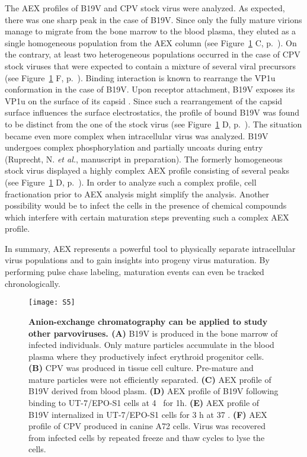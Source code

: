 The AEX profiles of B19V and CPV stock virus were analyzed. As expected, there was one sharp peak in the case of B19V. Since only the fully mature virions manage to migrate from the bone marrow to the blood plasma, they eluted as a single homogeneous population from the AEX column (see Figure~\ref{S5} C, p.~\pageref{S5}). On the contrary, at least two heterogeneous populations occurred in the case of CPV stock viruses that were expected to contain a mixture of several viral precursors (see Figure~\ref{S5} F, p.~\pageref{S5}). Binding interaction is known to rearrange the VP1u conformation in the case of B19V. Upon receptor attachment, B19V exposes its VP1u on the surface of its capsid \cite{pmid20826697}. Since such a rearrangement of the capsid surface influences the surface electrostatics, the profile of bound B19V was found to be distinct from the one of the stock virus (see Figure~\ref{S5} D, p.~\pageref{S5}). The situation became even more complex when intracellular virus was analyzed. B19V undergoes complex phosphorylation and partially uncoats during entry (Ruprecht, N. \textit{et al.}, manuscript in preparation). The formerly homogeneous stock virus displayed a highly complex AEX profile consisting of several peaks (see Figure~\ref{S5} D, p.~\pageref{S5}). In order to analyze such a complex profile, cell fractionation prior to AEX analysis might simplify the analysis. Another possibility would be to infect the cells in the presence of chemical compounds which interfere with certain maturation steps preventing such a complex AEX profile. 

In summary, AEX represents a powerful tool to physically separate intracellular virus populations and to gain insights into progeny virus maturation. By performing pulse chase labeling, maturation events can even be tracked chronologically.         
 






\begin{figure}
\centering
  \texttt{[image: S5]} \\[-0.2cm]
  \caption[Anion-Exchange Chromatography Performed with B19V]
   {\textbf{Anion-exchange chromatography can be applied to study other parvoviruses. (A)} B19V is produced in the bone marrow of infected individuals. Only mature particles accumulate in the blood plasma where they productively infect erythroid progenitor cells. \textbf{(B)} CPV was produced in tissue cell culture. Pre-mature and mature particles were not efficiently separated. \textbf{(C)} AEX profile of B19V derived from blood plasm. \textbf{(D)} AEX profile of B19V following binding to UT-7/EPO-S1 cells at 4 \textcelsius~for 1h. \textbf{(E)} AEX profile of B19V internalized in UT-7/EPO-S1 cells for 3 h at 37 \textcelsius.  \textbf{(F)} AEX profile of CPV produced in canine A72 cells. Virus was recovered from infected cells by repeated freeze and thaw cycles to lyse the cells.} 
\label{S5}
\end{figure}





    




\renewcommand\thefigure{\thechapter.\arabic{figure}} 

